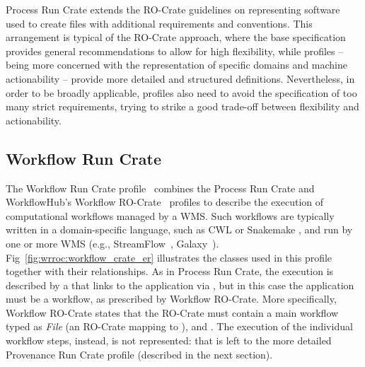 Process Run Crate extends the RO-Crate guidelines on representing software used to create files with additional requirements and conventions.
This arrangement is typical of the RO-Crate approach, where the base specification provides general recommendations to allow for high flexibility, while profiles -- being more concerned with the representation of specific domains and machine actionability -- provide more detailed and structured definitions.
Nevertheless, in order to be broadly applicable, profiles also need to avoid the specification of too many strict requirements, trying to strike a good trade-off between flexibility and actionability.


\subsection{Workflow Run Crate}\label{wrroc:workflow-run-crate}

The Workflow Run Crate profile~\cite{WRROC 2024b} combines the Process Run Crate and WorkflowHub's Workflow RO-Crate~\cite{Bacall 2022} profiles to describe the execution of computational workflows managed by a WMS.
Such workflows are typically written in a domain-specific language, such as CWL or Snakemake
\cite{Koster 2012}, and run by one or more WMS (e.g., StreamFlow~\cite{Colonnelli 2021}, Galaxy~\cite{Galaxy 2022}).
Fig~\ref{fig:wrroc:workflow_crate_er} illustrates the classes used in this profile together with their relationships.
%
As in Process Run Crate, the execution is described by a 
that links to the application via , but in this case the application must be a workflow, as prescribed by Workflow RO-Crate.
More specifically, Workflow RO-Crate states that the RO-Crate must contain a main workflow typed as \emph{File} (an RO-Crate mapping to ), 
and .
The execution of the individual workflow steps, instead, is not represented: that is left to the more detailed Provenance Run Crate profile (described in the next section).

